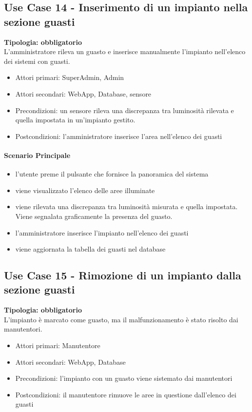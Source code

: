 \documentclass[12pt]{article}
\begin{document}
\subsection{Use Case 14 - Inserimento di un impianto nella sezione guasti}
\textbf{Tipologia: obbligatorio} \\
L'amministratore rileva un guasto e inserisce manualmente l'impianto nell'elenco dei sistemi con guasti.
\begin{itemize}
	\item Attori primari: SuperAdmin, Admin
	\item Attori secondari: WebApp, Database, sensore
	\item Precondizioni: un sensore rileva una discrepanza tra luminosità rilevata e quella impostata in un'impianto gestito.
	\item Postcondizioni: l'amministratore inserisce l'area nell'elenco dei guasti
\end{itemize}
\paragraph{Scenario Principale}
\begin{itemize}
	\item l'utente preme il pulsante che fornisce la panoramica del sistema
	\item viene visualizzato l'elenco delle aree illuminate
	\item viene rilevata una discrepanza tra luminosità misurata e quella impostata. Viene segnalata graficamente la presenza del guasto.
	\item l'amministratore inserisce l'impianto nell'elenco dei guasti
	\item viene aggiornata la tabella dei guasti nel database
\end{itemize}

\subsection{Use Case 15 - Rimozione di un impianto dalla sezione guasti}
\textbf{Tipologia: obbligatorio} \\
L'impianto è marcato come guasto, ma il malfunzionamento è stato risolto dai manutentori.
\begin{itemize}
	\item Attori primari: Manutentore
	\item Attori secondari: WebApp, Database
	\item Precondizioni: l'impianto con un guasto viene sistemato dai manutentori
	\item Postcondizioni: il manutentore rimuove le aree in questione dall'elenco dei guasti
\end{itemize}
\end{document}
